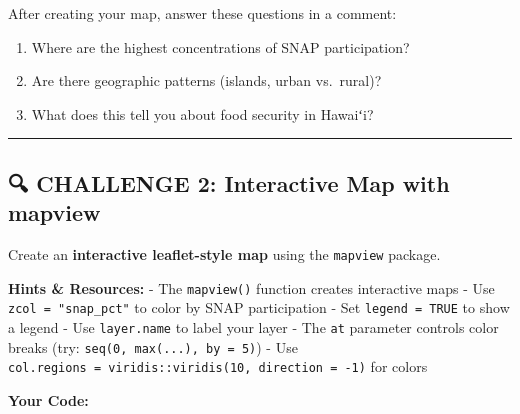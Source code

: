 \documentclass[
  letterpaper,
  DIV=11,
  numbers=noendperiod]{scrartcl}
\providecommand{\tightlist}{%
  \setlength{\itemsep}{0pt}\setlength{\parskip}{0pt}}\usepackage{longtable,booktabs,array}
\begin{document}
\begin{tcolorbox}[enhanced jigsaw, title=\textcolor{quarto-callout-note-color}{\faInfo}\hspace{0.5em}{💭 Reflection on Your Map}, titlerule=0mm, coltitle=black, colbacktitle=quarto-callout-note-color!10!white, colback=white, left=2mm, toprule=.15mm, opacitybacktitle=0.6, toptitle=1mm, colframe=quarto-callout-note-color-frame, bottomtitle=1mm, arc=.35mm, bottomrule=.15mm, breakable, leftrule=.75mm, opacityback=0, rightrule=.15mm]

After creating your map, answer these questions in a comment:

\begin{enumerate}
\def\labelenumi{\arabic{enumi}.}
\tightlist
\item
  Where are the highest concentrations of SNAP participation?
\item
  Are there geographic patterns (islands, urban vs.~rural)?
\item
  What does this tell you about food security in Hawaiʻi?
\end{enumerate}

\end{tcolorbox}

\begin{center}\rule{0.5\linewidth}{0.5pt}\end{center}

\subsection{🔍 CHALLENGE 2: Interactive Map with
mapview}\label{challenge-2-interactive-map-with-mapview}

\begin{tcolorbox}[enhanced jigsaw, title=\textcolor{quarto-callout-warning-color}{\faExclamationTriangle}\hspace{0.5em}{Your Task}, titlerule=0mm, coltitle=black, colbacktitle=quarto-callout-warning-color!10!white, colback=white, left=2mm, toprule=.15mm, opacitybacktitle=0.6, toptitle=1mm, colframe=quarto-callout-warning-color-frame, bottomtitle=1mm, arc=.35mm, bottomrule=.15mm, breakable, leftrule=.75mm, opacityback=0, rightrule=.15mm]

Create an \textbf{interactive leaflet-style map} using the
\texttt{mapview} package.

\textbf{Hints \& Resources:} - The \texttt{mapview()} function creates
interactive maps - Use \texttt{zcol\ =\ "snap\_pct"} to color by SNAP
participation - Set \texttt{legend\ =\ TRUE} to show a legend - Use
\texttt{layer.name} to label your layer - The \texttt{at} parameter
controls color breaks (try: \texttt{seq(0,\ max(...),\ by\ =\ 5)}) - Use
\texttt{col.regions\ =\ viridis::viridis(10,\ direction\ =\ -1)} for
colors

\textbf{Your Code:}

\end{tcolorbox}
\end{document}
